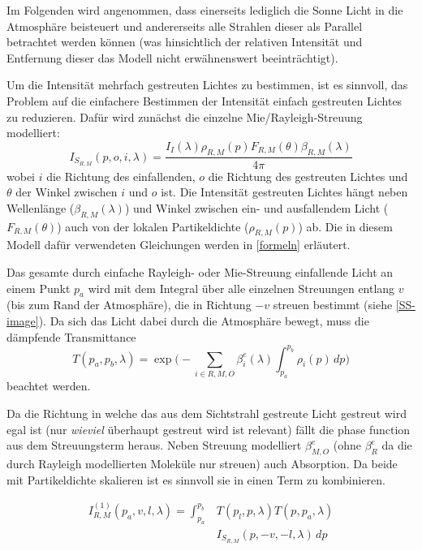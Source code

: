 Im Folgenden wird angenommen, dass einerseits lediglich die Sonne Licht in die Atmosphäre beisteuert und andererseits
alle Strahlen dieser als Parallel betrachtet werden können (was hinsichtlich der relativen Intensität und Entfernung
dieser das Modell nicht erwähnenswert beeinträchtigt).

Um die Intensität mehrfach gestreuten Lichtes zu bestimmen, ist es sinnvoll, das Problem auf die einfachere Bestimmen
der Intensität einfach gestreuten Lichtes zu reduzieren. Dafür wird zunächst die einzelne Mie/Rayleigh-Streuung
modelliert:
\begin{equation}
	I_{S_{R,M}}(p, o, i, \lambda) = \frac{I_I(\lambda)\rho_{R,M}(p)F_{R,M}(\theta)\beta_{R,M}(\lambda)}{4\pi}
\end{equation}
wobei $i$ die Richtung des einfallenden, $o$ die Richtung des gestreuten Lichtes und $\theta$ der Winkel zwischen $i$
und $o$ ist. Die Intensität gestreuten Lichtes hängt neben Wellenlänge ($\beta_{R,M}(\lambda)$) und Winkel zwischen ein-
und ausfallendem Licht ($F_{R,M}(\theta)$) auch von der lokalen Partikeldichte ($\rho_{R,M}(p)$) ab. Die in diesem
Modell dafür verwendeten Gleichungen werden in \cref{formeln} erläutert.

Das gesamte durch einfache Rayleigh- oder Mie-Streuung einfallende Licht an einem Punkt $p_a$ wird mit dem Integral über
alle einzelnen Streuungen entlang $v$ (bis zum Rand der Atmosphäre), die in Richtung $-v$ streuen bestimmt (siehe
\cref{SS-image}). Da sich das Licht dabei durch die Atmosphäre bewegt, muss die dämpfende Transmittance
\begin{equation}
	T(p_a, p_b, \lambda) = \exp\bigg(-\sum_{i\in R,M,O}^{} \beta^e_i(\lambda) \int_{p_a}^{p_b} \rho_i(p) \,dp\bigg)
\end{equation}
beachtet werden.

Da die Richtung in welche das aus dem Sichtstrahl gestreute Licht gestreut wird egal ist (nur \textit{wieviel} überhaupt
gestreut wird ist relevant) fällt die phase function aus dem Streuungsterm heraus. Neben Streuung modelliert
$\beta^e_{M,O}$ (ohne $\beta^e_R$ da die durch Rayleigh modellierten Moleküle nur streuen) auch Absorption. Da beide
mit Partikeldichte skalieren ist es sinnvoll sie in einen Term zu kombinieren.

\begin{equation}\label{eq:ss}
	\begin{aligned}
		I^{(1)}_{R,M}(p_a,v,l,\lambda) = \int_{p_a}^{p_b} &T(p_l, p, \lambda)T(p, p_a, \lambda) \\
		&I_{S_{R,M}}(p, -v, -l, \lambda) \,dp\\
	\end{aligned}
\end{equation}

